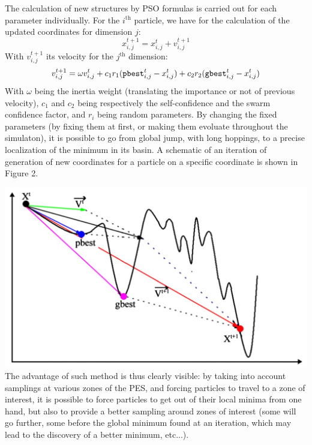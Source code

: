 \documentclass[11pt]{article}
\begin{document}
\begin{multicols}{2}
The calculation of new structures by PSO formulas is carried out for each parameter individually.
For the $i^\text{th}$ particle, we have for the calculation of the updated coordinates for dimension $j$:
\begin{equation}
    x_{i,j}^{t+1}=x_{i,j}^{t}+v_{i,j}^{t+1}
\end{equation}
With $v_{i,j}^{t+1}$ its velocity for the $j^\text{th}$ dimension:
\begin{equation}
    v_{i,j}^{t+1}=\omega v_{i,j}^t+c_1r_1(\verb+pbest+_{i,j}^t-x_{i,j}^t)+c_2r_2(\verb+gbest+_{i,j}^t-x_{i,j}^t)
\end{equation}
With $\omega$ being the inertia weight (translating the importance or not of previous velocity), $c_1$ and $c_2$ being respectively the self-confidence and the swarm confidence factor, and $r_i$ being random parameters. By changing the fixed parameters (by fixing them at first, or making them evoluate throughout the simulaton), it is possible to go from global jump, with long hoppings, to a precise localization of the minimum in its basin.
A schematic of an iteration of generation of new coordinates for a particle on a specific coordinate is shown in Figure 2. 
\bigskip

              \noindent \includegraphics[width=\columnwidth]{figures/PSO.png}
                \medskip
The advantage of such method is thus clearly visible: by taking into account samplings at various zones of the PES, and forcing particles to travel to a zone of interest, it is possible to force particles to get out of their local minima from one hand, but also to provide a better sampling around zones of interest (some will go further, some before the global minimum found at an iteration, which may lead to the discovery of a better minimum, etc...).\vspace{1em}


\end{multicols}
\end{document}
